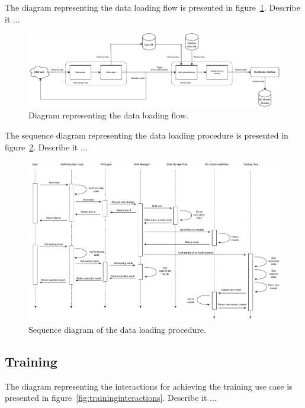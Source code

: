 The diagram representing the data loading flow is presented in figure~\ref{fig:loadingflow}.
Describe it ...

\begin{figure}[H]
\centering 
\includegraphics[width=1\textwidth]{images/architecture_data_loading_flow}
\caption{Diagram representing the data loading flow.}
\label{fig:loadingflow}
\end{figure}

The sequence diagram representing the data loading procedure is presented in figure~\ref{fig:loadingsequence}.
Describe it ...

\begin{figure}[H]
\centering 
\includegraphics[width=1\textwidth]{images/architecture_data_loading_sequence}
\caption{Sequence diagram of the data loading procedure.}
\label{fig:loadingsequence}
\end{figure}


\vspace{0.1 cm}
\subsection{Training}
\label{sec:training}
\vspace{0.1 cm}

The diagram representing the interactions for achieving the training use case is presented in figure~\ref{fig:traininginteractions}.
Describe it ...

